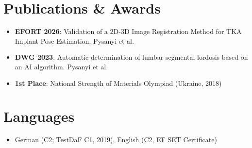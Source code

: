\documentclass[letterpaper,10pt]{article}
\newcommand{\resumeItem}[1]{
    \item\small{#1}\vspace{-0.5pt}
}
\newcommand{\resumeSubHeadingList}{\begin{itemize}[leftmargin=0.15in, label={}]\vspace{-2pt}}
\newcommand{\resumeSubHeadingListEnd}{\end{itemize}}
\begin{document}
\section{Publications \& Awards}
\resumeSubHeadingList
  \resumeItem{\textbf{EFORT 2026}: Validation of a 2D-3D Image Registration Method for TKA Implant Pose Estimation. Pysanyi et al.}
  \resumeItem{\textbf{DWG 2023}: Automatic determination of lumbar segmental lordosis based on an AI algorithm. Pysanyi et al.}
  \resumeItem{\textbf{1st Place}: National Strength of Materials Olympiad (Ukraine, 2018)}
\resumeSubHeadingListEnd

\section{Languages}
\resumeSubHeadingList
  \resumeItem{German (C2; TestDaF C1, 2019), English (C2, EF SET Certificate)}
\resumeSubHeadingListEnd
\end{document}
